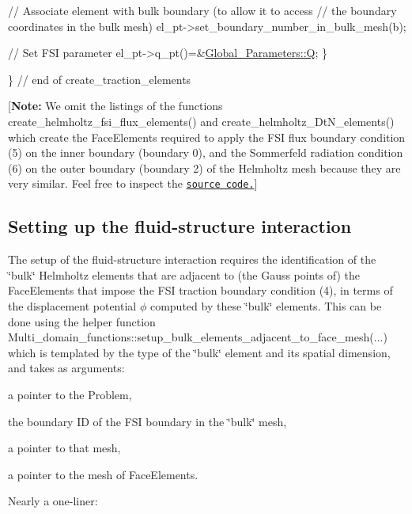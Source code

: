 \begin{DoxyCodeInclude}
   
   \textcolor{comment}{// Associate element with bulk boundary (to allow it to access}
   \textcolor{comment}{// the boundary coordinates in the bulk mesh)}
   el\_pt->set\_boundary\_number\_in\_bulk\_mesh(b); 
   
   \textcolor{comment}{// Set FSI parameter}
   el\_pt->q\_pt()=&\hyperlink{namespaceGlobal__Parameters_a7814fddf663e56168174a42d2cd6b4c1}{Global\_Parameters::Q};          
  \}
 
\} \textcolor{comment}{// end of create\_traction\_elements}

\end{DoxyCodeInclude}


\mbox{[}{\bfseries Note\+:} We omit the listings of the functions {\ttfamily create\+\_\+helmholtz\+\_\+fsi\+\_\+flux\+\_\+elements()} and {\ttfamily create\+\_\+helmholtz\+\_\+\+Dt\+N\+\_\+elements()} which create the {\ttfamily Face\+Elements} required to apply the F\+SI flux boundary condition (5) on the inner boundary (boundary 0), and the Sommerfeld radiation condition (6) on the outer boundary (boundary 2) of the Helmholtz mesh because they are very similar. Feel free to inspect the \href{../../../../demo_drivers/interaction/acoustic_fsi/acoustic_fsi.cc}{\tt source code.}\mbox{]}



 

\hypertarget{index_fsi}{}\subsection{Setting up the fluid-\/structure interaction}\label{index_fsi}
The setup of the fluid-\/structure interaction requires the identification of the \char`\"{}bulk\char`\"{} Helmholtz elements that are adjacent to (the Gauss points of) the {\ttfamily Face\+Elements} that impose the F\+SI traction boundary condition (4), in terms of the displacement potential $ \phi $ computed by these \char`\"{}bulk\char`\"{} elements. This can be done using the helper function {\ttfamily Multi\+\_\+domain\+\_\+functions\+::setup\+\_\+bulk\+\_\+elements\+\_\+adjacent\+\_\+to\+\_\+face\+\_\+mesh}(...) which is templated by the type of the \char`\"{}bulk\char`\"{} element and its spatial dimension, and takes as arguments\+:
\begin{DoxyItemize}
\item a pointer to the {\ttfamily Problem},
\item the boundary ID of the F\+SI boundary in the \char`\"{}bulk\char`\"{} mesh,
\item a pointer to that mesh,
\item a pointer to the mesh of {\ttfamily Face\+Elements}.
\end{DoxyItemize}Nearly a one-\/liner\+:


